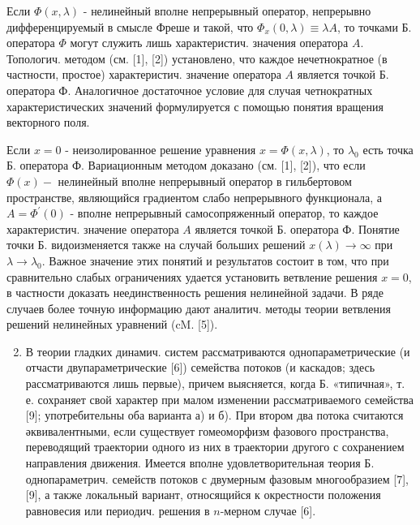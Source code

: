 \documentclass[10pt]{article}
\begin{document}
Если $\Phi(x, \lambda)$ - нелинейный вполне непрерывный оператор, непрерывно дифференцируемый в смысле Фреше и такой, что $\Phi_{x}(0, \lambda) \equiv \lambda A$, то точками Б. оператора $\Phi$ могут служить лишь характеристич. значения оператора $A$. Топологич. методом (см. [1], [2]) установлено, что каждое нечетнократное (в частности, простое) характеристич. значение оператора $A$ является точкой Б. оператора Ф. Аналогичное достаточное условие для случая четнократных характеристических значений формулируется с помощью понятия вращения векторного поля.



Если $x=0$ - неизолированное решение уравнения $x=\Phi(x, \lambda)$, то $\lambda_{0}$ есть точка Б. оператора Ф. Вариационным методом доказано (см. [1], [2]), что если $\Phi(x)-$ нелинейный вполне непрерывный оператор в гильбертовом пространстве, являющийся градиентом слабо непрерывного функционала, а $A=\Phi^{\prime}(0)$ - вполне непрерывный самосопряженный оператор, то каждое характеристич. значение оператора $A$ является точкой Б. оператора Ф. Понятие точки Б. видоизменяется также на случай больших решений $x(\lambda) \rightarrow \infty$ при $\lambda \rightarrow \lambda_{0}$. Важное значение этих понятий и результатов состоит в том, что при сравнительно слабых ограничениях удается установить ветвление решения $x=0$, в частности доказать неединственность решения нелинейной задачи. В ряде случаев более точную информацию дают аналитич. методы теории ветвления решений нелинейных уравнений (cM. [5]).



\begin{enumerate}

  \setcounter{enumi}{1}

  \item В теории гладких динамич. систем рассматриваются однопараметрические (и отчасти двупараметрические [6]) семейства потоков (и каскадов; здесь рассматриваются лишь первые), причем выясняется, когда Б. «типичная», т. е. сохраняет свой характер при малом изменении рассматриваемого семейства [9]; употребительны оба варианта а) и б). При втором два потока считаются әквивалентными, если существует гомеоморфизм фазового пространства, переводящий траектории одного из них в траектории другого с сохранением направления движения. Имеется вполне удовлетворительная теория Б. однопараметрич. семейств потоков с двумерным фазовым многообразием [7], [9], а также локальный вариант, относящийся к окрестности положения равновесия или периодич. решения в $n$-мерном случае [6].

\end{enumerate}
\end{document}
